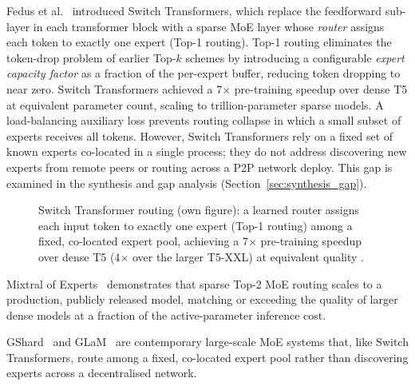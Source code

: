 Fedus et al.~\cite{Fedus2022} introduced Switch Transformers, which replace the feedforward
sub-layer in each transformer block with a sparse MoE layer whose \textit{router}
assigns each token to exactly one expert (Top-1 routing). Top-1 routing eliminates the
token-drop problem of earlier Top-$k$ schemes by introducing a configurable \textit{expert
capacity factor} as a fraction of the per-expert buffer, reducing token dropping to near zero. Switch Transformers achieved
a 7$\times$ pre-training speedup over dense T5 at equivalent parameter count, scaling
to trillion-parameter sparse models. A load-balancing auxiliary loss prevents routing
collapse in which a small subset of experts receives all tokens. However, Switch
Transformers rely on a fixed set of known experts co-located in a single process; they do
not address discovering new experts from remote peers or routing across a P2P network
deploy. This gap is examined in the synthesis and gap analysis
(Section~\ref{sec:synthesis_gap}).
\begin{figure}[H]
  \centering
  \caption{Switch Transformer routing (own figure): a learned router assigns
    each input token to exactly one expert (Top-1 routing) among a fixed,
    co-located expert pool, achieving a 7$\times$ pre-training speedup over
    dense T5 (4$\times$ over the larger T5-XXL) at equivalent quality
    \cite{Fedus2022}.}
  \label{fig:switch_transformer}
\end{figure}

Mixtral of Experts~\cite{JiangMixtral2024} demonstrates that sparse Top-2 MoE routing scales to a production, publicly released model, matching or exceeding the quality of larger dense models at a fraction of the active-parameter inference cost.

GShard~\cite{LepikhinGShard2021} and GLaM~\cite{DuGLaM2022} are contemporary large-scale MoE systems that, like Switch Transformers, route among a fixed, co-located expert pool rather than discovering experts across a decentralised network.

